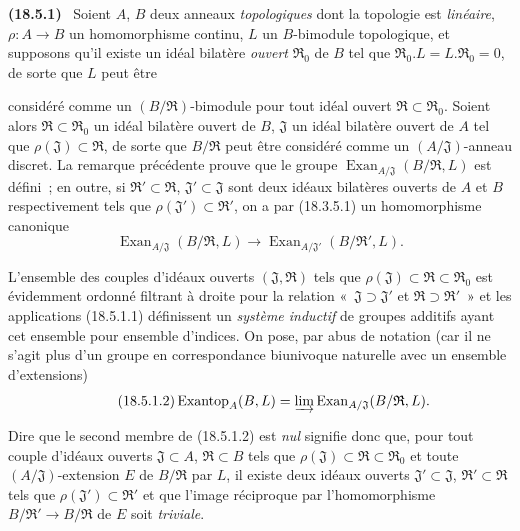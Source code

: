 \documentclass[10pt,oneside]{book}
\makeatletter
\newcommand{\setmanualcurrentlabel}[1]{\def\@currentlabel{#1}}
\newcommand{\oldpage}[2][]{%
  \setcounter{footnote}{0}%
  \marginpar{\scriptsize\textbf{#1}~|~#2}\ignorespaces}
\newenvironment{env}[1][]{\setmanualcurrentlabel{#1}\par\medskip\noindent\textbf{(#1)}\ }{\par}
\makeatother
\begin{document}
\begin{env}[18.5.1]
\label{0.18.5.1-fr}
Soient $A$, $B$ deux anneaux \emph{topologiques} dont la topologie est
\emph{linéaire}, $\rho:A\to B$ un homomorphisme continu, $L$ un $B$-bimodule
topologique, et supposons qu'il existe un idéal bilatère \emph{ouvert}
$\mathfrak R_0$ de $B$ tel que
$\mathfrak R_0.L=L.\mathfrak R_0=0$, de sorte que $L$ peut être

\oldpage[0\textsubscript{IV-1}]{67}

considéré comme un $(B/\mathfrak R)$-bimodule pour tout idéal ouvert
$\mathfrak R\subset\mathfrak R_0$. Soient alors
$\mathfrak R\subset\mathfrak R_0$ un idéal bilatère ouvert de $B$,
$\mathfrak J$ un idéal bilatère ouvert de $A$ tel que
$\rho(\mathfrak J)\subset\mathfrak R$, de sorte que $B/\mathfrak R$ peut être
considéré comme un $(A/\mathfrak J)$-anneau discret. La remarque précédente
prouve que le groupe
$\operatorname{Exan}_{A/\mathfrak J}(B/\mathfrak R,L)$ est défini~; en outre,
si $\mathfrak R'\subset\mathfrak R$, $\mathfrak J'\subset\mathfrak J$ sont
deux idéaux bilatères ouverts de $A$ et $B$ respectivement tels que
$\rho(\mathfrak J')\subset\mathfrak R'$, on a par (18.3.5.1) un homomorphisme
canonique
\begin{equation}
\label{0.18.5.1.1-fr}
\tag{18.5.1.1}
  \operatorname{Exan}_{A/\mathfrak J}(B/\mathfrak R,L)
  \longrightarrow
  \operatorname{Exan}_{A/\mathfrak J'}(B/\mathfrak R',L).
\end{equation}

L'ensemble des couples d'idéaux ouverts $(\mathfrak J,\mathfrak R)$ tels que
$\rho(\mathfrak J)\subset\mathfrak R\subset\mathfrak R_0$ est évidemment
ordonné filtrant à droite pour la relation «~$\mathfrak J\supset\mathfrak J'$
et $\mathfrak R\supset\mathfrak R'$~» et les applications (18.5.1.1)
définissent un \emph{système inductif} de groupes additifs ayant cet ensemble
pour ensemble d'indices. On pose, par abus de notation (car il ne s'agit plus
d'un groupe en correspondance biunivoque naturelle avec un ensemble
d'extensions)
\begin{equation}
\label{0.18.5.1.2-fr}
\tag{18.5.1.2}
  \operatorname{Exantop}_A(B,L)
  =\varinjlim\operatorname{Exan}_{A/\mathfrak J}(B/\mathfrak R,L).
\end{equation}

Dire que le second membre de (18.5.1.2) est \emph{nul} signifie donc que, pour
tout couple d'idéaux ouverts $\mathfrak J\subset A$, $\mathfrak R\subset B$
tels que $\rho(\mathfrak J)\subset\mathfrak R\subset\mathfrak R_0$ et toute
$(A/\mathfrak J)$-extension $E$ de $B/\mathfrak R$ par $L$, il existe deux
idéaux ouverts $\mathfrak J'\subset\mathfrak J$,
$\mathfrak R'\subset\mathfrak R$ tels que
$\rho(\mathfrak J')\subset\mathfrak R'$ et que l'image réciproque par
l'homomorphisme $B/\mathfrak R'\to B/\mathfrak R$ de $E$ soit \emph{triviale}.


\end{env}
\end{document}
